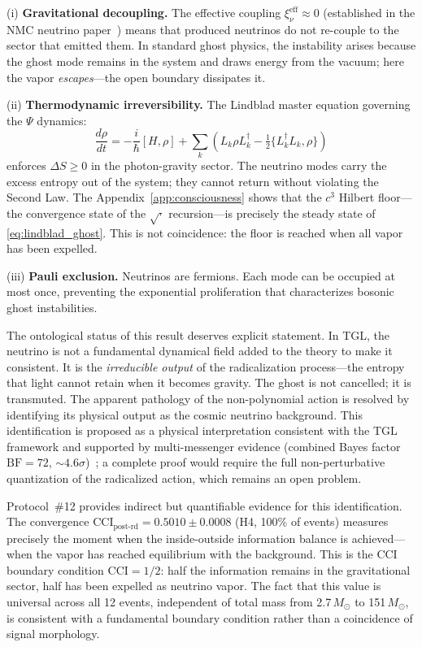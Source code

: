 \documentclass[12pt,a4paper,twocolumn]{article}
\newcommand{\CCI}{\text{CCI}}
\begin{document}
(i) \textbf{Gravitational decoupling.} The effective coupling 
$\xi_\nu^{\text{eff}} \approx 0$ (established in the NMC neutrino 
paper~\cite{Miguel2025NMC}) means that produced neutrinos do not 
re-couple to the sector that emitted them. In standard ghost physics, 
the instability arises because the ghost mode remains in the system and 
draws energy from the vacuum; here the vapor \emph{escapes}---the open 
boundary dissipates it.

(ii) \textbf{Thermodynamic irreversibility.} The Lindblad master equation 
governing the $\Psi$ dynamics:
\begin{equation}
\frac{d\rho}{dt} = -\frac{i}{\hbar}[H,\rho] + 
\sum_k\!\left(L_k\rho L_k^\dagger 
- \tfrac{1}{2}\{L_k^\dagger L_k,\rho\}\right)
\label{eq:lindblad_ghost}
\end{equation}
enforces $\Delta S \geq 0$ in the photon-gravity sector. The neutrino modes 
carry the excess entropy out of the system; they cannot return without 
violating the Second Law. The Appendix~\ref{app:consciousness} shows that 
the $c^3$ Hilbert floor---the convergence state of the $\sqrt{\cdot}$ 
recursion---is precisely the steady state of \eqref{eq:lindblad_ghost}. 
This is not coincidence: the floor is reached when all vapor has been expelled.

(iii) \textbf{Pauli exclusion.} Neutrinos are fermions. Each mode can be 
occupied at most once, preventing the exponential proliferation that 
characterizes bosonic ghost instabilities.

The ontological status of this result deserves explicit statement. In TGL, 
the neutrino is not a fundamental dynamical field added to the theory to 
make it consistent. It is the \emph{irreducible output} of the radicalization 
process---the entropy that light cannot retain when it becomes gravity. 
The ghost is not cancelled; it is transmuted. The apparent pathology of 
the non-polynomial action is resolved by identifying its physical output as 
the cosmic neutrino background. This identification is proposed as a physical 
interpretation consistent with the TGL framework and supported by 
multi-messenger evidence (combined Bayes factor $\text{BF} = 72$, 
$\sim 4.6\sigma$)~\cite{Miguel2025NMC}; a complete proof would require 
the full non-perturbative quantization of the radicalized action, which 
remains an open problem.

Protocol~\#12 provides indirect but quantifiable evidence for this 
identification. The convergence $\CCI_{\text{post-rd}} = 0.5010 \pm 0.0008$ 
(H4, 100\% of events) measures precisely the moment when the inside-outside 
information balance is achieved---when the vapor has reached equilibrium 
with the background. This is the CCI boundary condition $\CCI = 1/2$: 
half the information remains in the gravitational sector, half has been 
expelled as neutrino vapor. The fact that this value is universal across 
all 12 events, independent of total mass from 2.7\,$M_\odot$ to 
151\,$M_\odot$, is consistent with a fundamental boundary condition rather 
than a coincidence of signal morphology.
\end{document}
